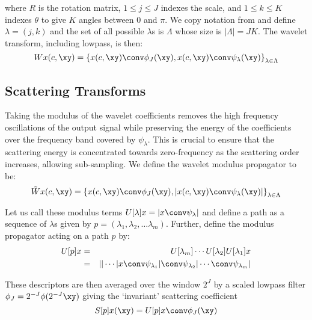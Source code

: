 where $R$ is the rotation matrix, $1 \leq j \leq J$ indexes the scale, and
$1 \leq k \leq K$ indexes $\theta$ to give $K$ angles between $0$ and $\pi$. We
copy notation from \cite{bruna_invariant_2013} and define $\lambda = (j, k)$ and
the set of all possible $\lambda$s is $\Lambda$ whose size is $|\Lambda | = JK$.
The wavelet transform, including lowpass, is then:
%
\begin{equation}
  Wx(c, \xy) = \left\{ x(c, \xy)\conv \phi_J(\xy), x(c, \xy)\conv \psi_\lambda (\xy) \right\}_{\lambda \in \Lambda}
\end{equation}

\subsection{Scattering Transforms}\label{sec:ch5:scatter}
Taking the modulus of the wavelet coefficients removes the high frequency
oscillations of the output signal while preserving the energy of the
coefficients over the frequency band covered by $\psi_\lambda$. This is crucial
to ensure that the scattering energy is concentrated towards zero-frequency as
the scattering order increases, allowing sub-sampling.
We define the wavelet modulus propagator to be:
%
\begin{equation}
  \label{eq:ch5:wave_mod}
  \tilde{W}x(c, \xy) = \left\{ x(c, \xy) \conv \phi_{J}(\xy), |x(c, \xy) \conv \psi_\lambda (\xy) | \right\}_{\lambda \in \Lambda} 
\end{equation}

Let us call these modulus terms $U[\lambda] x = \lvert x \conv \psi_\lambda
\rvert$ and define a path as a sequence of $\lambda$s given by $p = \left(\lambda_1,
\lambda_2, \ldots \lambda_m \right)$. Further, define the modulus propagator
acting on a path $p$ by:
%
\begin{eqnarray}
  U[p]x & = & U[\lambda_m] \cdots U[\lambda_2]U[\lambda_1]x \label{eq:u_paths}\\
        & = & || \cdots | x\conv \psi_{\lambda_1} | \conv \psi_{\lambda_2} | \cdots \conv \psi_{\lambda_m} |
\end{eqnarray}

These descriptors are then averaged over the window $2^J$ by a scaled lowpass filter $\phi_J =
2^{-J}\phi(2^{-J}\xy)$ giving the `invariant' scattering coefficient
%
\begin{equation}
  S[p]x(\xy) = U[p]x \conv \phi_J(\xy) \label{eq:ch5:wavemod}
\end{equation}

